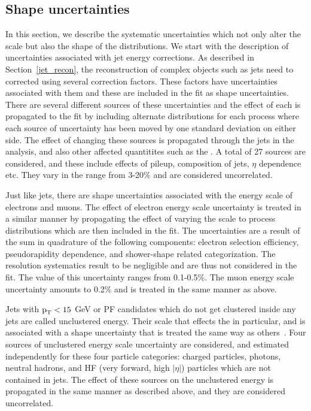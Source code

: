 \subsection{Shape uncertainties}
In this section, we describe the systematic uncertainties which not only alter the scale but also the shape of the distributions. We start with the description of uncertainties associated with jet energy corrections. As described in Section~\ref{jet_recon}, the reconstruction of complex objects such as jets need to corrected using several correction factors. These factors have uncertainties associated with them and these are included in the fit as shape uncertainties. There are several different sources of these uncertainties and the effect of each is propagated to the fit by including alternate distributions for each process where each source of uncertainty has been moved by one standard deviation on either side. The effect of changing these sources is propagated through the jets in the analysis, and also other affected quantitites such as the \ptmiss. A total of 27 sources are considered, and these include effects of pileup, composition of jets, $\eta$ dependence etc. They vary in the range from 3-20\% and are considered uncorrelated.

Just like jets, there are shape uncertainties associated with the energy scale of electrons and muons. The effect of electron energy scale uncertainty is treated in a similar manner by propagating the effect of varying the scale to process distributions which are then included in the fit. The uncertainties are a result of the sum in quadrature of the following components: electron selection efficiency, pseudorapidity dependence, and shower-shape related categorization. The resolution systematics result to be negligible and are thus not considered in the fit. The value of this uncertainty ranges from 0.1-0.5\%. The muon energy scale uncertainty amounts to 0.2\% and is treated in the same manner as above.

Jets with $\text{p}_\text{T}<15$ GeV or PF candidates which do not get clustered inside any jets are called unclustered energy. Their scale that effects the \ptmiss in particular, and is associated with a shape uncertainty that is treated the same way as others~\cite{Sirunyan:2019kia}. Four sources of unclustered energy scale uncertainty are considered, and estimated independently for these four particle categories: charged particles, photons, neutral hadrons, and HF (very forward, high $|\eta|$) particles which are not contained in jets. The effect of these sources on the unclustered energy is propagated in the same manner as described above, and they are considered uncorrelated.

